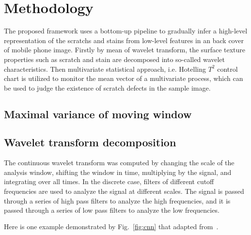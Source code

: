 \chapter{Methodology}
\label{cp:Methodology}

The proposed framework uses a bottom-up pipeline to 
gradually infer a high-level representation of the scratchs and stains from low-level features in an back cover of mobile phone image. Firstly by mean of wavelet transform, the surface texture properties such as scratch and stain are decomposed into so-called wavelet characteristics. Then multivariate statistical approach, i.e. Hotelling $T^{2}$ control chart is utilized to monitor the mean vector of a multivariate process, which can be used to judge the existence of scratch defects in the sample image. 

\section{Maximal variance of moving window}


\section{Wavelet transform decomposition}
The continuous wavelet transform was computed by changing the scale of the analysis window, shifting the window in time, multiplying by the signal, and integrating over all times. In the discrete case, filters of different cutoff frequencies are used to analyze the signal at different scales. The signal is passed through a series of high pass filters to analyze the high frequencies, and it is passed through a series of low pass filters to analyze the low frequencies.



Here is one example demonstrated by Fig.~\ref{fig:cnn} that adapted from~\cite{hijazi2015using}. 


